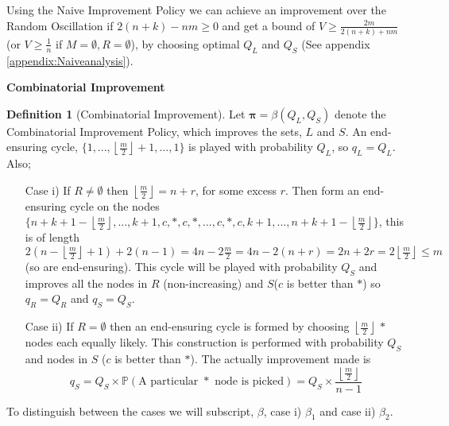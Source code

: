 \documentclass[a4paper,10pt]{article}
\newcommand{\halflength}{\ensuremath{\floor{\frac{m}{2}}}}
\newcommand{\floor}[1]{\left \lfloor #1 \right \rfloor}
\theoremstyle{definition}
\newtheorem{definition}[theorem]{Definition}
\theoremstyle{definition}
\theoremstyle{remark}
\theoremstyle{definition}
\begin{document}
\begin{examplefigure}
\begin{center}
{\begin{tikzpicture}[-,auto,node distance=1.5cm,
                    thick,main node/.style={circle,fill=white,draw,font=\sffamily\Large\bfseries}]
   
\end{tikzpicture}
}
\end{center}
\caption{The Naive Improvement on $S_{4}^{9}$ for $m=9$. The \textcolor{red}{red lines indicating the end-ensuring cycle $\{1,2,3,4,5,4,3,2,1 \}$} and the other coloured lines indicating the end-ensuring cycles, for each $*$, $\{*,c,10,9,8,9,10,c,* \}$ (as $\halflength=4$).}
\end{examplefigure}


Using the Naive Improvement Policy we can achieve an improvement over the Random Oscillation if $2(n+k) -nm \geq 0$ and get a bound of $V \geq \frac{2m}{2(n+k)+nm}$ (or $V \geq \frac{1}{n}$ if $M=\emptyset,R=\emptyset$), by choosing optimal $Q_{L}$ and $Q_{S}$ (See  appendix \ref{appendix:Naiveanalysis}).


\begin{myfigure}
\begin{center}

\end{center}
\caption{Interception probabilities of $S^5_{4}$ when $m=4$, with the \textcolor{red}{red Probabilities showing the Naive Improvement Policy $\alpha \left(\frac{2}{17},\frac{6}{17} \right)$}.}
\end{myfigure}

\textbf{Combinatorial Improvement}

\begin{definition}[Combinatorial Improvement]
Let $\bm{\pi}=\beta(Q_{L},Q_{S})$ denote the Combinatorial Improvement Policy, which improves the sets, $L$ and $S$. An end-ensuring cycle, $\{ 1,...,\floor{\frac{m}{2}}+1,...,1 \}$ is played with probability $Q_{L}$, so $q_{L}=Q_{L}$. Also;

\begin{enumerate}
\item[Case i)] If $R \neq \emptyset$ then $\floor{\frac{m}{2}}=n+r$, for some excess $r$. Then form an end-ensuring cycle on the nodes $\{ n+k+1-\floor{\frac{m}{2}},...,k+1,c,*,c,*,...,c,*,c,k+1,...,n+k+1-\floor{\frac{m}{2}} \}$, this is of length $2(n-\floor{\frac{m}{2}}+1)+2(n-1)=4n-2 \frac{m}{2}=4n-2(n+r)=2n+2r=2 \floor{\frac{m}{2}} \leq m$ (so are end-ensuring). This cycle will be played with probability $Q_{S}$ and improves all the nodes in $R$ (non-increasing) and $S$($c$ is better than $*$) so $q_{R}=Q_{R}$ and $q_{S}=Q_{S}$.

\item[Case ii)] If $R = \emptyset$ then an end-ensuring cycle is formed by choosing $\halflength$ $*$ nodes each equally likely. This construction is performed with probability $Q_{S}$ and nodes in $S$ ($c$ is better than $*$). The actually improvement made is $$q_{S}=Q_{S} \times \mathbb{P}(\text{A particular } * \text{ node is picked})=Q_{S} \times \frac{\floor{\frac{m}{2}}}{n-1} $$
\end{enumerate}
To distinguish between the cases we will subscript, $\beta$, case i) $\beta_{1}$ and case ii) $\beta_{2}$.
\end{definition}
\end{document}
